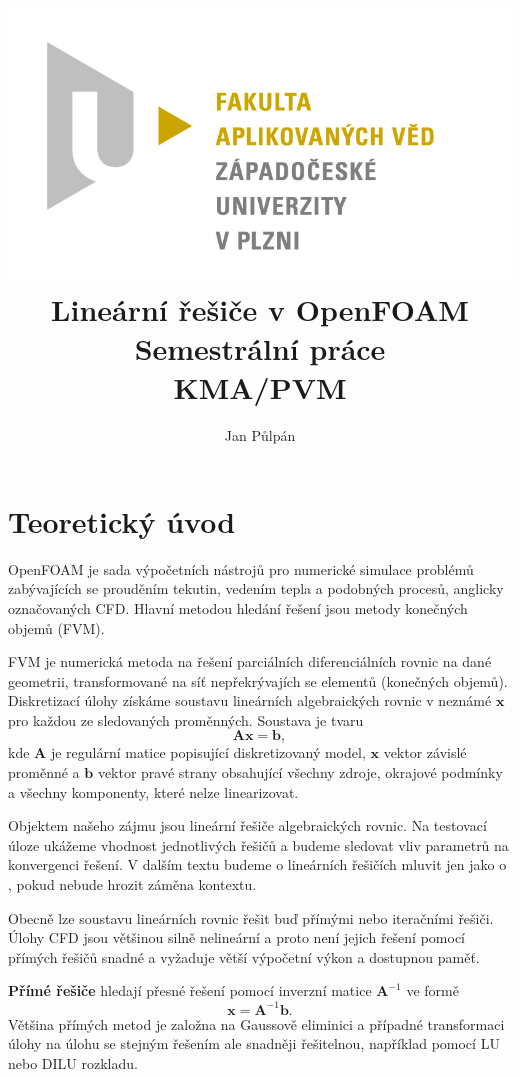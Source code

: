 \documentclass[a4paper,12pt]{report}
\title{
	{\includegraphics[width=\linewidth]{FAV_logo.jpg}}\\[2cm]
	{Lineární řešiče v OpenFOAM}\\	
	{\small{Semestrální práce}}\\
	{\small{KMA/PVM}}\\
}
\author{Jan Půlpán}
\theoremstyle{remark}
\begin{document}
	\maketitle

	{\let\clearpage\relax \chapter{Teoretický úvod}}

	OpenFOAM je sada výpočetních nástrojů pro numerické simulace problémů zabývajících se prouděním tekutin, vedením tepla a podobných procesů, anglicky označovaných CFD. Hlavní metodou  hledání řešení jsou metody konečných objemů (FVM). 
	
	FVM je numerická metoda na řešení parciálních diferenciálních rovnic na dané geometrii, transformované na síť nepřekrývajích se elementů (konečných objemů). Diskretizací úlohy získáme soustavu lineárních algebraických rovnic v neznámé $\boldsymbol{x}$ pro každou ze sledovaných proměnných. Soustava je tvaru
	\begin{equation}
		\boldsymbol{A}\boldsymbol{x} = \boldsymbol{b},
		\label{eq:linear_set}
	\end{equation}
	kde $\boldsymbol{A}$ je regulární matice popisující diskretizovaný model, $\boldsymbol{x}$ vektor závislé proměnné a $\boldsymbol{b}$ vektor pravé strany obsahující všechny zdroje, okrajové podmínky a všechny komponenty, které nelze linearizovat. 
	
	Objektem našeho zájmu jsou lineární řešiče algebraických rovnic. Na testovací úloze ukážeme vhodnost jednotlivých řešičů a budeme sledovat vliv parametrů na konvergenci řešení. V dalším textu budeme o lineárních řešičích mluvit jen jako o  , pokud nebude hrozit záměna kontextu.
	
	Obecně lze soustavu lineárních rovnic řešit buď přímými nebo iteračními řešiči. Úlohy CFD jsou většinou silně nelineární a proto není jejich řešení pomocí přímých řešičů snadné a vyžaduje větší výpočetní výkon a dostupnou paměť.
	
	\textbf{Přímé řešiče} hledají přesné řešení pomocí inverzní matice $\boldsymbol{A} ^{-1}$ ve formě
\begin{equation}
	\boldsymbol{x} = \boldsymbol{A}^{-1} \boldsymbol{b}.	
\end{equation}  
Většina přímých metod je založna na Gaussově eliminici a případné transformaci úlohy na úlohu se stejným řešením ale snadněji řešitelnou, například pomocí LU nebo DILU rozkladu.
\end{document}
